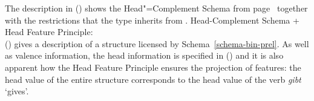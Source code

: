 The description in () shows the Head"=Complement Schema from page~\pageref{schema-bin-prel} together with the restrictions that the type
 inherits from .
\eas
\label{head-arg-schema-hfp}
Head-Complement Schema + Head Feature Principle:\\
\zs
() gives a description of a structure licensed by Schema~\ref{schema-bin-prel}.
As well as valence information, the head information is specified in () and it is also apparent how the Head Feature Principle
ensures the projection of features: the head value of the entire structure  corresponds to
the head value of the verb \emph{gibt} `gives'.
\ea
{}
\z


